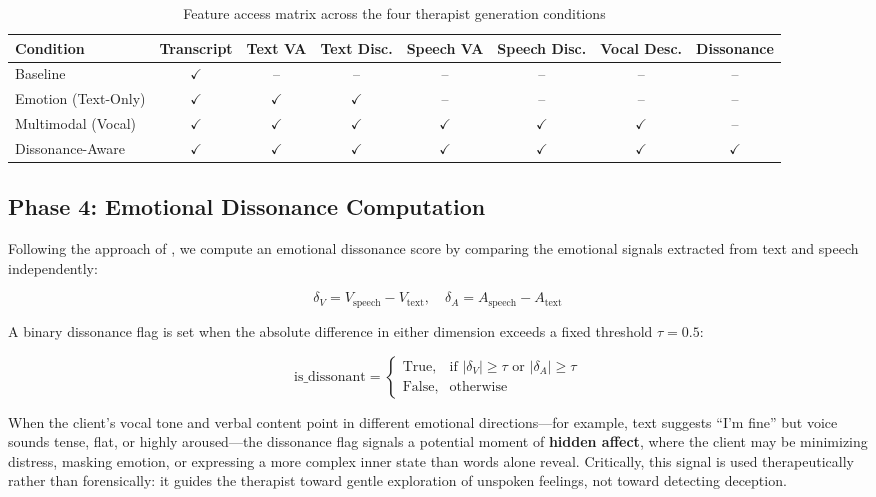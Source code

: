 \begin{table}[hbt!]
\centering
\caption{Feature access matrix across the four therapist generation conditions}
\begin{tabular}{lccccccc}
\hline
\textbf{Condition} & \textbf{Transcript} & \textbf{Text VA} & \textbf{Text Disc.} & \textbf{Speech VA} & \textbf{Speech Disc.} & \textbf{Vocal Desc.} & \textbf{Dissonance} \\
\hline
Baseline           & $\checkmark$ & -- & -- & -- & -- & -- & -- \\
Emotion (Text-Only)& $\checkmark$ & $\checkmark$ & $\checkmark$ & -- & -- & -- & -- \\
Multimodal (Vocal) & $\checkmark$ & $\checkmark$ & $\checkmark$ & $\checkmark$ & $\checkmark$ & $\checkmark$ & -- \\
Dissonance-Aware   & $\checkmark$ & $\checkmark$ & $\checkmark$ & $\checkmark$ & $\checkmark$ & $\checkmark$ & $\checkmark$ \\
\hline
\end{tabular}
\label{tab:condition-features}
\end{table}


\subsection{Phase 4: Emotional Dissonance Computation}

Following the approach of \cite{haydarov-etal-2025-towards}, we compute an emotional dissonance score by comparing the emotional signals extracted from text and speech independently:

\begin{equation}
    \delta_V = V_{\text{speech}} - V_{\text{text}}, \quad \delta_A = A_{\text{speech}} - A_{\text{text}}
\end{equation}

A binary dissonance flag is set when the absolute difference in either dimension exceeds a fixed threshold $\tau = 0.5$:

\begin{equation}
    \text{is\_dissonant} = 
    \begin{cases}
        \text{True}, & \text{if } |\delta_V| \geq \tau \text{ or } |\delta_A| \geq \tau \\
        \text{False}, & \text{otherwise}
    \end{cases}
\end{equation}

When the client's vocal tone and verbal content point in different emotional directions---for example, text suggests ``I'm fine'' but voice sounds tense, flat, or highly aroused---the dissonance flag signals a potential moment of \textbf{hidden affect}, where the client may be minimizing distress, masking emotion, or expressing a more complex inner state than words alone reveal. Critically, this signal is used therapeutically rather than forensically: it guides the therapist toward gentle exploration of unspoken feelings, not toward detecting deception.


